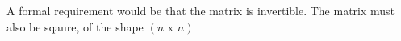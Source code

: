 A formal requirement would be that the matrix is invertible. The matrix must also be sqaure, of the shape $(n \text{ x } n)$
